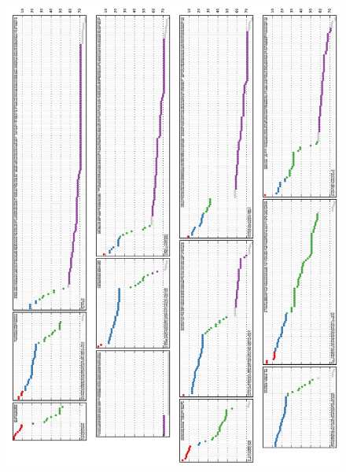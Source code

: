 \documentclass{article}
\begin{document}
\begin{figure}[h!]

  \centering 
    \centerline{\includegraphics[width=6.5in]{mouseretina/retina.1.2.bb.0.0.data-fixed_20_12-anneal_slow_fixed_400.truth_latent.pdf}}
  \caption{}
\label{fig:supp:retinabbfixedclusters}
\end{figure}
\end{document}

